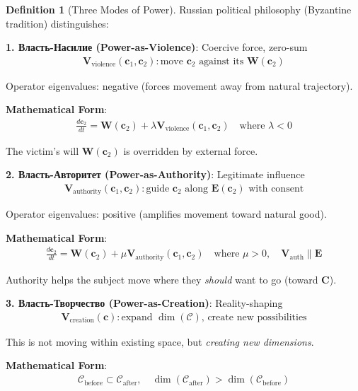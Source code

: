 \documentclass[11pt,a4paper]{article}
\theoremstyle{definition}
\newtheorem{definition}{Definition}[section]
\theoremstyle{remark}
\newcommand{\CC}{\mathcal{C}}
\newcommand{\EE}{\mathbf{E}}
\newcommand{\WW}{\mathbf{W}}
\newcommand{\VV}{\mathbf{V}}
\newcommand{\cc}{\mathbf{c}}
\begin{document}
\begin{small}
\begin{enumerate}
\begin{definition}[Three Modes of Power]
Russian political philosophy (Byzantine tradition) distinguishes:

\textbf{1. Власть-Насилие (Power-as-Violence)}: Coercive force, zero-sum
\begin{align}
\VV_{\text{violence}}(\cc_1, \cc_2): \text{move } \cc_2 \text{ against its } \WW(\cc_2)
\end{align}

Operator eigenvalues: negative (forces movement away from natural trajectory).

\textbf{Mathematical Form}:
\begin{align}
\frac{d\cc_2}{dt} = \WW(\cc_2) + \lambda \VV_{\text{violence}}(\cc_1, \cc_2) \quad \text{where } \lambda < 0
\end{align}

The victim's will \(\WW(\cc_2)\) is overridden by external force.

\textbf{2. Власть-Авторитет (Power-as-Authority)}: Legitimate influence
\begin{align}
\VV_{\text{authority}}(\cc_1, \cc_2): \text{guide } \cc_2 \text{ along } \EE(\cc_2) \text{ with consent}
\end{align}

Operator eigenvalues: positive (amplifies movement toward natural good).

\textbf{Mathematical Form}:
\begin{align}
\frac{d\cc_2}{dt} = \WW(\cc_2) + \mu \VV_{\text{authority}}(\cc_1, \cc_2) \quad \text{where } \mu > 0, \quad \VV_{\text{auth}} \parallel \EE
\end{align}

Authority helps the subject move where they \textit{should} want to go (toward \(\mathbf{C}\)).

\textbf{3. Власть-Творчество (Power-as-Creation)}: Reality-shaping
\begin{align}
\VV_{\text{creation}}(\cc): \text{expand } \dim(\CC) \text{, create new possibilities}
\end{align}

This is not moving within existing space, but \textit{creating new dimensions}.

\textbf{Mathematical Form}:
\begin{align}
\CC_{\text{before}} \subset \CC_{\text{after}}, \quad \dim(\CC_{\text{after}}) > \dim(\CC_{\text{before}})
\end{align}


\end{definition}
\end{enumerate}
\end{small}
\end{document}

